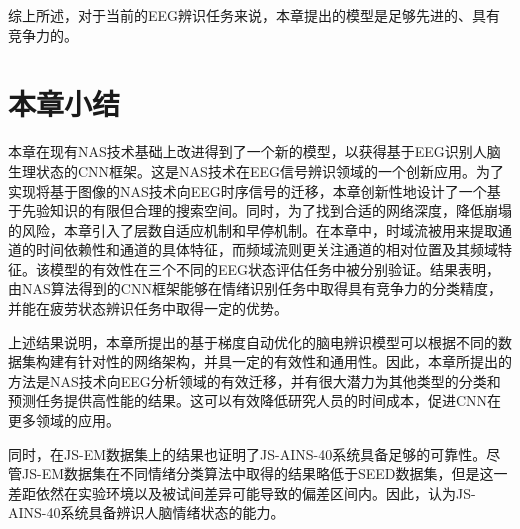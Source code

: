 综上所述，对于当前的EEG辨识任务来说，本章提出的模型是足够先进的、具有竞争力的。

\section{本章小结}

本章在现有NAS技术基础上改进得到了一个新的模型，以获得基于EEG识别人脑生理状态的CNN框架。这是NAS技术在EEG信号辨识领域的一个创新应用。为了实现将基于图像的NAS技术向EEG时序信号的迁移，本章创新性地设计了一个基于先验知识的有限但合理的搜索空间。同时，为了找到合适的网络深度，降低崩塌的风险，本章引入了层数自适应机制和早停机制。在本章中，时域流被用来提取通道的时间依赖性和通道的具体特征，而频域流则更关注通道的相对位置及其频域特征。该模型的有效性在三个不同的EEG状态评估任务中被分别验证。结果表明，由NAS算法得到的CNN框架能够在情绪识别任务中取得具有竞争力的分类精度，并能在疲劳状态辨识任务中取得一定的优势。

上述结果说明，本章所提出的基于梯度自动优化的脑电辨识模型可以根据不同的数据集构建有针对性的网络架构，并具一定的有效性和通用性。因此，本章所提出的方法是NAS技术向EEG分析领域的有效迁移，并有很大潜力为其他类型的分类和预测任务提供高性能的结果。这可以有效降低研究人员的时间成本，促进CNN在更多领域的应用。

同时，在JS-EM数据集上的结果也证明了JS-AINS-40系统具备足够的可靠性。尽管JS-EM数据集在不同情绪分类算法中取得的结果略低于SEED数据集，但是这一差距依然在实验环境以及被试间差异可能导致的偏差区间内。因此，认为JS-AINS-40系统具备辨识人脑情绪状态的能力。






